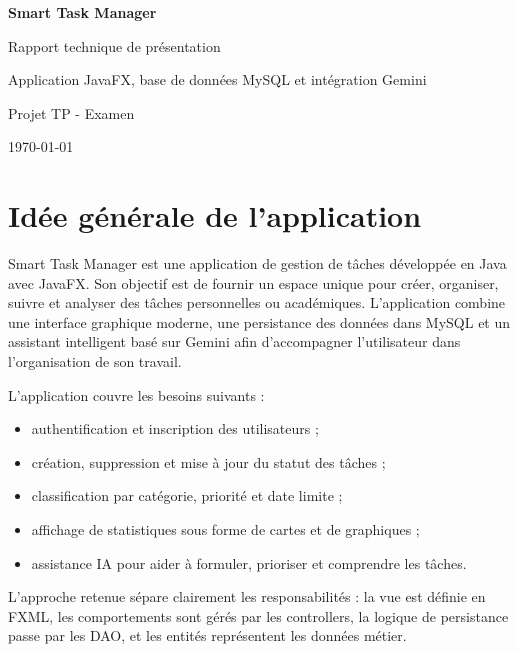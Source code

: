 \documentclass[11pt,a4paper]{article}
\begin{document}
\begin{titlepage}
    \centering
    \vspace*{2cm}
    {\Huge\bfseries Smart Task Manager\par}
    \vspace{0.7cm}
    {\Large Rapport technique de présentation\par}
    \vspace{1.5cm}
    {\large Application JavaFX, base de données MySQL et intégration Gemini\par}
    \vfill
    {\large Projet TP - Examen\par}
    \vspace{0.3cm}
    {\large \today\par}
\end{titlepage}

\tableofcontents
\newpage

\section{Idée générale de l'application}

Smart Task Manager est une application de gestion de tâches développée en Java avec JavaFX. Son objectif est de fournir un espace unique pour créer, organiser, suivre et analyser des tâches personnelles ou académiques. L'application combine une interface graphique moderne, une persistance des données dans MySQL et un assistant intelligent basé sur Gemini afin d'accompagner l'utilisateur dans l'organisation de son travail.

L'application couvre les besoins suivants :
\begin{itemize}[leftmargin=1.4em]
    \item authentification et inscription des utilisateurs ;
    \item création, suppression et mise à jour du statut des tâches ;
    \item classification par catégorie, priorité et date limite ;
    \item affichage de statistiques sous forme de cartes et de graphiques ;
    \item assistance IA pour aider à formuler, prioriser et comprendre les tâches.
\end{itemize}

L'approche retenue sépare clairement les responsabilités : la vue est définie en FXML, les comportements sont gérés par les controllers, la logique de persistance passe par les DAO, et les entités représentent les données métier.
\end{document}

